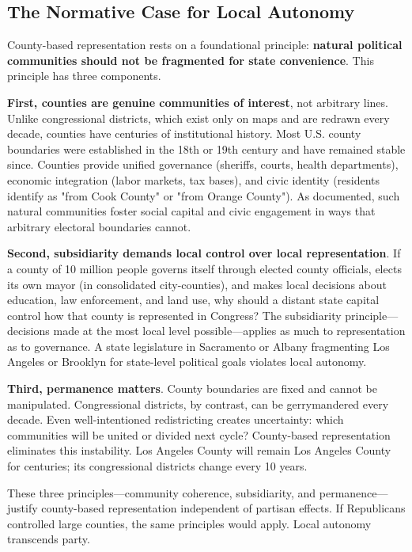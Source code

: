 \subsection{The Normative Case for Local Autonomy}

County-based representation rests on a foundational principle: \textbf{natural political communities should not be fragmented for state convenience}. This principle has three components.

\textbf{First, counties are genuine communities of interest}, not arbitrary lines. Unlike congressional districts, which exist only on maps and are redrawn every decade, counties have centuries of institutional history. Most U.S. county boundaries were established in the 18th or 19th century and have remained stable since. Counties provide unified governance (sheriffs, courts, health departments), economic integration (labor markets, tax bases), and civic identity (residents identify as "from Cook County" or "from Orange County"). As \citet{putnam2000bowling} documented, such natural communities foster social capital and civic engagement in ways that arbitrary electoral boundaries cannot.

\textbf{Second, subsidiarity demands local control over local representation}. If a county of 10 million people governs itself through elected county officials, elects its own mayor (in consolidated city-counties), and makes local decisions about education, law enforcement, and land use, why should a distant state capital control how that county is represented in Congress? The subsidiarity principle---decisions made at the most local level possible---applies as much to representation as to governance. A state legislature in Sacramento or Albany fragmenting Los Angeles or Brooklyn for state-level political goals violates local autonomy.

\textbf{Third, permanence matters}. County boundaries are fixed and cannot be manipulated. Congressional districts, by contrast, can be gerrymandered every decade. Even well-intentioned redistricting creates uncertainty: which communities will be united or divided next cycle? County-based representation eliminates this instability. Los Angeles County will remain Los Angeles County for centuries; its congressional districts change every 10 years.

These three principles---community coherence, subsidiarity, and permanence---justify county-based representation independent of partisan effects. If Republicans controlled large counties, the same principles would apply. Local autonomy transcends party.

